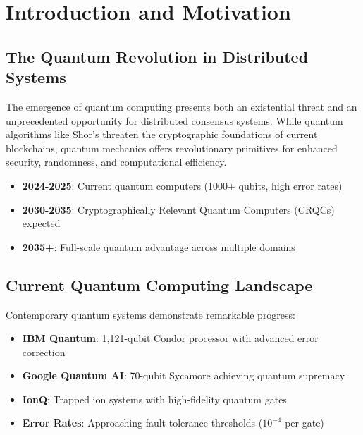 \documentclass[11pt,a4paper]{article}
\begin{document}
\newpage
\tableofcontents
\newpage

\section{Introduction and Motivation}

\subsection{The Quantum Revolution in Distributed Systems}

The emergence of quantum computing presents both an existential threat and an unprecedented opportunity for distributed consensus systems. While quantum algorithms like Shor's threaten the cryptographic foundations of current blockchains, quantum mechanics offers revolutionary primitives for enhanced security, randomness, and computational efficiency.

\begin{tcolorbox}[colback=quantumgold!10,colframe=quantumgold,title=\textbf{Quantum Threat Timeline}]
\begin{itemize}
    \item \textbf{2024-2025}: Current quantum computers (1000+ qubits, high error rates)
    \item \textbf{2030-2035}: Cryptographically Relevant Quantum Computers (CRQCs) expected
    \item \textbf{2035+}: Full-scale quantum advantage across multiple domains
\end{itemize}
\end{tcolorbox}

\subsection{Current Quantum Computing Landscape}

Contemporary quantum systems demonstrate remarkable progress:

\begin{itemize}
    \item \textbf{IBM Quantum}: 1,121-qubit Condor processor with advanced error correction
    \item \textbf{Google Quantum AI}: 70-qubit Sycamore achieving quantum supremacy
    \item \textbf{IonQ}: Trapped ion systems with high-fidelity quantum gates
    \item \textbf{Error Rates}: Approaching fault-tolerance thresholds ($10^{-4}$ per gate)
\end{itemize}
\end{document}
